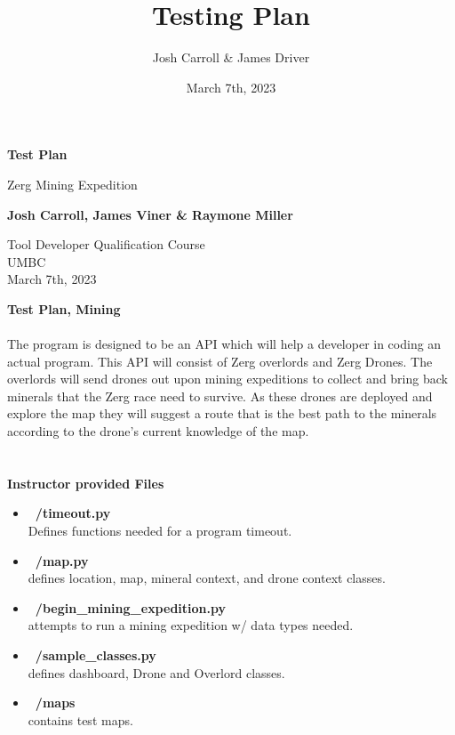 \documentclass{article}
\title{Testing Plan}
\author{Josh Carroll & James Driver}
\date{March 7th, 2023}
\begin{document}
\begin{titlepage}
   \begin{center}
       \vspace*{1cm}

       \textbf{Test Plan}

       \vspace{0.5cm}
        Zerg Mining Expedition
            
       \vspace{1.5cm}

       \textbf{Josh Carroll, James Viner \& Raymone Miller}

       \vfill
            
       \vspace{0.8cm}
            
       Tool Developer Qualification Course\\
       UMBC\\
       March 7th, 2023
            
   \end{center}
\end{titlepage}
\noindent\Huge\textbf{Test Plan, Mining}\\
\\
\Large{The program is designed to be an API which will help a developer in coding
an actual program. This API will consist of Zerg overlords and Zerg Drones.
The overlords will send drones out upon mining expeditions to collect and
bring back minerals that the Zerg race need to survive. As these drones are
deployed and explore the map they will suggest a route that is the best path
to the minerals according to the drone’s current knowledge of the map.}\\
\\

\\
\noindent\Large\textbf{Instructor provided Files}
\begin{itemize}
  \item \textbf{~/timeout.py}\\
  {Defines functions needed for a program timeout.}
   \item \textbf{~/map.py}\\
  {defines location, map, mineral context, and drone context classes.}
   \item \textbf{~/begin\_mining\_expedition.py}\\
  {attempts to run a mining expedition w/ data types needed.}
   \item \textbf{~/sample\_classes.py}\\
  {defines dashboard, Drone and Overlord classes.}
     \item \textbf{~/maps}\\
  {contains test maps.}
\end{itemize}
\end{document}
